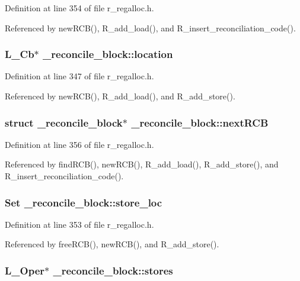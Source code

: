 Definition at line 354 of file r\_\-regalloc.h.

Referenced by new\-RCB(), R\_\-add\_\-load(), and R\_\-insert\_\-reconciliation\_\-code().
\subsubsection{\setlength{\rightskip}{0pt plus 5cm}L\_\-Cb$\ast$ \bf{\_\-reconcile\_\-block::location}}\label{struct__reconcile__block_49ca7d293b013cea34c299d89dd60d75}




Definition at line 347 of file r\_\-regalloc.h.

Referenced by new\-RCB(), R\_\-add\_\-load(), and R\_\-add\_\-store().
\subsubsection{\setlength{\rightskip}{0pt plus 5cm}struct \bf{\_\-reconcile\_\-block}$\ast$ \bf{\_\-reconcile\_\-block::next\-RCB}}\label{struct__reconcile__block_b5877ed0ddee44cc485d9b7f2dc04f84}




Definition at line 356 of file r\_\-regalloc.h.

Referenced by find\-RCB(), new\-RCB(), R\_\-add\_\-load(), R\_\-add\_\-store(), and R\_\-insert\_\-reconciliation\_\-code().
\subsubsection{\setlength{\rightskip}{0pt plus 5cm}\bf{Set} \bf{\_\-reconcile\_\-block::store\_\-loc}}\label{struct__reconcile__block_9bd6d1081e8470cbec6e8ddd3d20f978}




Definition at line 353 of file r\_\-regalloc.h.

Referenced by free\-RCB(), new\-RCB(), and R\_\-add\_\-store().
\subsubsection{\setlength{\rightskip}{0pt plus 5cm}L\_\-Oper$\ast$ \bf{\_\-reconcile\_\-block::stores}}\label{struct__reconcile__block_6ebade53385c54dcdc575359dbddda47}





